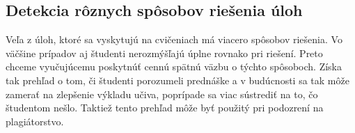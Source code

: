 \subsection{Detekcia rôznych spôsobov riešenia úloh}
\label{sec:apprequirements:similarsolutions}

Veľa z úloh, ktoré sa vyskytujú na cvičeniach má viacero spôsobov riešenia. Vo väčšine
prípadov aj študenti nerozmýšľajú úplne rovnako pri riešení. Preto chceme vyučujúcemu
poskytnúť cennú spätnú väzbu o týchto spôsoboch. Získa tak prehľad
o tom, či študenti porozumeli prednáške a v budúcnosti sa tak môže zamerať na zlepšenie
výkladu učiva, poprípade sa viac sústrediť na to, čo študentom nešlo. Taktiež
tento prehľad môže byť použitý pri podozrení na plagiátorstvo.